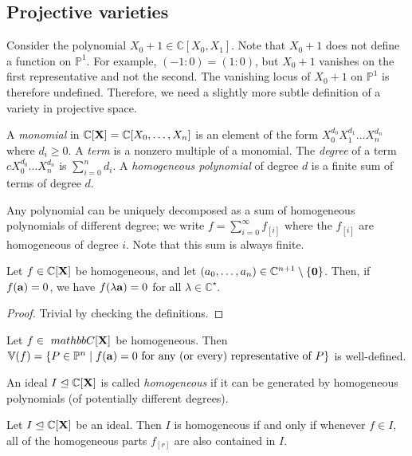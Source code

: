 \subsection{Projective varieties}
\begin{example}
    Consider the polynomial \( X_0 + 1 \in \mathbb C[X_0, X_1] \).
    Note that \( X_0 + 1 \) does not define a function on \( \mathbb P^1 \).
    For example, \( (-1 : 0) = (1 : 0) \), but \( X_0 + 1 \) vanishes on the first representative and not the second.
    The vanishing locus of \( X_0 + 1 \) on \( \mathbb P^1 \) is therefore undefined.
    Therefore, we need a slightly more subtle definition of a variety in projective space.
\end{example}
\begin{definition}
    A \emph{monomial} in \( \mathbb C[\vb X] = \mathbb C[X_0, \dots, X_n] \) is an element of the form \( X_0^{d_0} X_1^{d_1} \dots X_n^{d_n} \) where \( d_i \geq 0 \).
    A \emph{term} is a nonzero multiple of a monomial.
    The \emph{degree} of a term \( cX_0^{d_0} \dots X_n^{d_n} \) is \( \sum_{i=0}^n d_i \).
    A \emph{homogeneous polynomial} of degree \( d \) is a finite sum of terms of degree \( d \).
\end{definition}
Any polynomial can be uniquely decomposed as a sum of homogeneous polynomials of different degree; we write \( f = \sum_{i=0}^\infty f_{[i]} \) where the \( f_{[i]} \) are homogeneous of degree \( i \).
Note that this sum is always finite.
\begin{lemma}
    Let \( f \in \mathbb C[\vb X] \) be homogeneous, and let \( (a_0, \dots, a_n) \in \mathbb C^{n+1} \setminus \qty{\vb 0} \).
    Then, if \( f(\vb a) = 0 \), we have \( f(\lambda \vb a) = 0 \) for all \( \lambda \in \mathbb C^\star \).
\end{lemma}
\begin{proof}
    Trivial by checking the definitions.
\end{proof}
\begin{corollary}
    Let \( f \in\ mathbb C[\vb X] \) be homogeneous.
    Then \( \mathbb V(f) = \qty{P \in \mathbb P^n \mid f(\vb a) = 0 \text{ for any (or every) representative of } P} \) is well-defined.
\end{corollary}
\begin{definition}
    An ideal \( I \trianglelefteq \mathbb C[\vb X] \) is called \emph{homogeneous} if it can be generated by homogeneous polynomials (of potentially different degrees).
\end{definition}
\begin{lemma}
    Let \( I \trianglelefteq \mathbb C[\vb X] \) be an ideal.
    Then \( I \) is homogeneous if and only if whenever \( f \in I \), all of the homogeneous parts \( f_{[r]} \) are also contained in \( I \).
\end{lemma}
